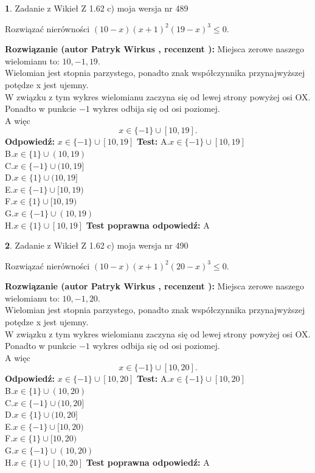\documentclass[12pt, a4paper]{article}
\theoremstyle{definition} %
\newtheorem{zad}{}
\newcommand{\zadStart}[1]{\begin{zad}#1\newline}
\newcommand{\zadStop}{\end{zad}}
\newcommand{\rozwStart}[2]{\noindent \textbf{Rozwiązanie (autor #1 , recenzent #2): }\newline}
\newcommand{\rozwStop}{\newline}
\newcommand{\odpStart}{\noindent \textbf{Odpowiedź:}\newline}
\newcommand{\odpStop}{\newline}
\newcommand{\testStart}{\noindent \textbf{Test:}\newline}
\newcommand{\testStop}{\newline}
\newcommand{\kluczStart}{\noindent \textbf{Test poprawna odpowiedź:}\newline}
\newcommand{\kluczStop}{\newline}
\begin{document}
\zadStart{Zadanie z Wikieł Z 1.62 c) moja wersja nr 489}

Rozwiązać nierówności $(10-x)(x+1)^{2}(19-x)^{3}\le0$.
\zadStop
\rozwStart{Patryk Wirkus}{}
Miejsca zerowe naszego wielomianu to: $10, -1, 19$.\\
Wielomian jest stopnia parzystego, ponadto znak współczynnika przy\linebreak najwyższej potędze x jest ujemny.\\ W związku z tym wykres wielomianu zaczyna się od lewej strony powyżej osi OX.\\
Ponadto w punkcie $-1$ wykres odbija się od osi poziomej.\\
A więc $$x \in \{-1\} \cup [10,19].$$
\rozwStop
\odpStart
$x \in \{-1\} \cup [10,19]$
\odpStop
\testStart
A.$x \in \{-1\} \cup [10,19]$\\
B.$x \in \{1\} \cup (10,19)$\\
C.$x \in \{-1\} \cup (10,19]$\\
D.$x \in \{1\} \cup (10,19]$\\
E.$x \in \{-1\} \cup [10,19)$\\
F.$x \in \{1\} \cup [10,19)$\\
G.$x \in \{-1\} \cup (10,19)$\\
H.$x \in \{1\} \cup [10,19]$
\testStop
\kluczStart
A
\kluczStop



\zadStart{Zadanie z Wikieł Z 1.62 c) moja wersja nr 490}

Rozwiązać nierówności $(10-x)(x+1)^{2}(20-x)^{3}\le0$.
\zadStop
\rozwStart{Patryk Wirkus}{}
Miejsca zerowe naszego wielomianu to: $10, -1, 20$.\\
Wielomian jest stopnia parzystego, ponadto znak współczynnika przy\linebreak najwyższej potędze x jest ujemny.\\ W związku z tym wykres wielomianu zaczyna się od lewej strony powyżej osi OX.\\
Ponadto w punkcie $-1$ wykres odbija się od osi poziomej.\\
A więc $$x \in \{-1\} \cup [10,20].$$
\rozwStop
\odpStart
$x \in \{-1\} \cup [10,20]$
\odpStop
\testStart
A.$x \in \{-1\} \cup [10,20]$\\
B.$x \in \{1\} \cup (10,20)$\\
C.$x \in \{-1\} \cup (10,20]$\\
D.$x \in \{1\} \cup (10,20]$\\
E.$x \in \{-1\} \cup [10,20)$\\
F.$x \in \{1\} \cup [10,20)$\\
G.$x \in \{-1\} \cup (10,20)$\\
H.$x \in \{1\} \cup [10,20]$
\testStop
\kluczStart
A
\kluczStop
\end{document}
